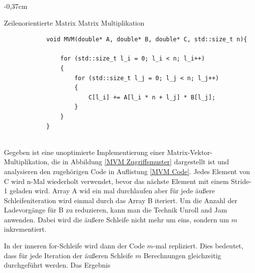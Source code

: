 \documentclass[sigconf,language=ngerman]{acmart}
\begin{document}
    \begin{tiny}
        \begin{adjustwidth}{-0,37cm}{}
        \begin{footnotesize}
        \begin{auflistung}
        \caption{Zeilenorientierte Matrix Matrix Multiplikation}
        \label{MVM Code}
        \begin{verbatim}
            void MVM(double* A, double* B, double* C, std::size_t n){

                for (std::size_t l_i = 0; l_i < n; l_i++)
                {
                    for (std::size_t l_j = 0; l_j < n; l_j++)
                    {
                        C[l_i] += A[l_i * n + l_j] * B[l_j]; 
                    }
                }
            }
            
        \end{verbatim}
        \end{auflistung}
        \end{footnotesize}
        \end{adjustwidth}
        \end{tiny}

Gegeben ist eine unoptimierte Implementierung einer Matrix-Vektor-Multiplikation,
die in Abbildung \ref{MVM Zugriffsmuster} dargestellt ist und
analysieren den zugehörigen Code in Auflistung \ref{MVM Code}.
Jedes Element von C wird n-Mal wiederholt verwendet, bevor das nächste Element mit einem Stride-1 geladen wird.
Array A wid ein mal durchlaufen aber für jede äußere Schleifeniteration wird einmal durch das Array B iteriert.
Um die Anzahl der Ladevorgänge für B zu reduzieren, 
kann man die Technik Unroll and Jam anwenden.
Dabei wird die äußere Schleife nicht mehr um eins, 
sondern um \(m\) inkrementiert. 


In der inneren for-Schleife wird dann der Code \(m\)-mal repliziert.
Dies bedeutet, dass für jede Iteration der äußeren Schleife \(m\) 
Berechnungen gleichzeitig durchgeführt werden. Das Ergebnis 
\end{document}
